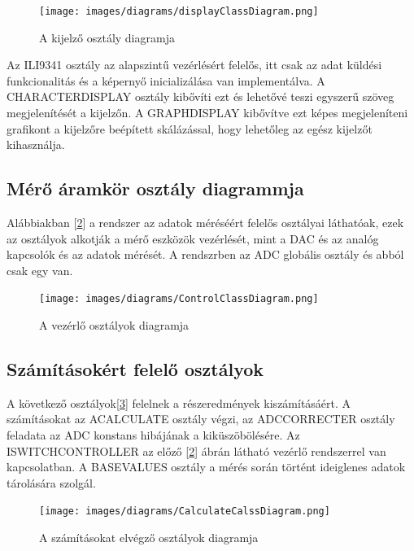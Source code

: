 \begin{figure}[H]
    \centering
    \texttt{[image: images/diagrams/displayClassDiagram.png]}
    \caption{A kijelző osztály diagramja}
    \label{fig:displayClassDiagram}
\end{figure}

Az ILI9341 osztály az alapszintű vezérlésért felelős, itt csak az 
adat küldési funkcionalitás és a képernyő inicializálása van
implementálva. A CHARACTERDISPLAY osztály kibővíti ezt és lehetővé
teszi egyszerű szöveg megjelenítését a kijelzőn.
A GRAPHDISPLAY kibővítve ezt képes megjeleníteni grafikont
a kijelzőre beépített skálázással, hogy lehetőleg az egész kijelzőt kihasználja.


\subsection{Mérő áramkör osztály diagrammja}

Alábbiakban [\ref{fig:ControlClassDiagram}] a rendszer az adatok méréséért felelős osztályai láthatóak,
ezek az osztályok alkotják a mérő eszközök vezérlését, mint a 
DAC és az analóg kapcsolók és az adatok mérését.
A rendszrben az ADC globális osztály és abból csak egy van.

\begin{figure}[H]
    \centering
    \texttt{[image: images/diagrams/ControlClassDiagram.png]}
    \caption{A vezérlő osztályok diagramja}
    \label{fig:ControlClassDiagram}
\end{figure}


\subsection{Számításokért felelő osztályok}

A következő osztályok[\ref{fig:CalculateClassDiagram}] felelnek a részeredmények kiszámításáért. A 
számításokat az ACALCULATE osztály végzi, az ADCCORRECTER osztály
feladata az ADC konstans hibájának a kiküszöbölésére. Az 
ISWITCHCONTROLLER az előző [\ref{fig:ControlClassDiagram}] ábrán látható
vezérlő rendszerrel van kapcsolatban. A BASEVALUES osztály a mérés során
történt ideiglenes adatok tárolására szolgál.


\begin{figure}[H]
    \centering
    \texttt{[image: images/diagrams/CalculateCalssDiagram.png]}
    \caption{A számításokat elvégző osztályok diagramja}
    \label{fig:CalculateClassDiagram}
\end{figure}


